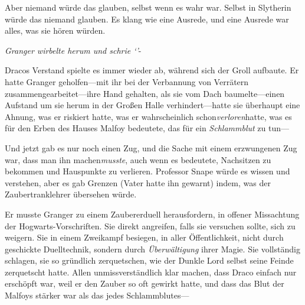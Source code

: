 Aber niemand würde das glauben, selbst wenn es wahr war. Selbst in Slytherin würde das niemand glauben. Es klang wie eine Ausrede, und eine Ausrede war alles, was sie hören würden.

\emph{Granger wirbelte herum und schrie ‘’}-

Dracos Verstand spielte es immer wieder ab, während sich der Groll aufbaute. Er hatte Granger geholfen—mit ihr bei der Verbannung von Verrätern zusammengearbeitet—ihre Hand gehalten, als sie vom Dach baumelte—einen Aufstand um sie herum in der Großen Halle verhindert—hatte sie überhaupt eine Ahnung, was er riskiert hatte, was er wahrscheinlich schon\emph{verloren}hatte, was es für den Erben des Hauses Malfoy bedeutete, das für ein \emph{Schlammblut} zu tun—

Und jetzt gab es nur noch einen Zug, und die Sache mit einem erzwungenen Zug war, dass man ihn machen\emph{musste}, auch wenn es bedeutete, Nachsitzen zu bekommen und Hauspunkte zu verlieren. Professor Snape würde es wissen und verstehen, aber es gab Grenzen (Vater hatte ihn gewarnt) indem, was der Zaubertranklehrer übersehen würde.

Er musste Granger zu einem Zaubererduell herausfordern, in offener Missachtung der Hogwarts-Vorschriften. Sie direkt angreifen, falls sie versuchen sollte, sich zu weigern. Sie in einem Zweikampf besiegen, in aller Öffentlichkeit, nicht durch geschickte Duelltechnik, sondern durch \emph{Überwältigung} ihrer Magie. Sie vollständig schlagen, sie so gründlich zerquetschen, wie der Dunkle Lord selbst seine Feinde zerquetscht hatte. Allen unmissverständlich klar machen, dass Draco einfach nur erschöpft war, weil er den Zauber so oft gewirkt hatte, und dass das Blut der Malfoys stärker war als das jedes Schlammblutes—


